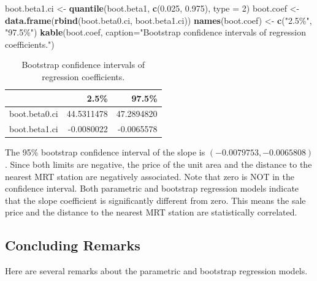 \documentclass[
]{book}
\newenvironment{Shaded}{\begin{snugshade}}{\end{snugshade}}
\newcommand{\AttributeTok}[1]{\textcolor[rgb]{0.13,0.29,0.53}{#1}}
\newcommand{\DecValTok}[1]{\textcolor[rgb]{0.00,0.00,0.81}{#1}}
\newcommand{\FloatTok}[1]{\textcolor[rgb]{0.00,0.00,0.81}{#1}}
\newcommand{\FunctionTok}[1]{\textcolor[rgb]{0.13,0.29,0.53}{\textbf{#1}}}
\newcommand{\NormalTok}[1]{#1}
\newcommand{\OtherTok}[1]{\textcolor[rgb]{0.56,0.35,0.01}{#1}}
\newcommand{\StringTok}[1]{\textcolor[rgb]{0.31,0.60,0.02}{#1}}
\begin{document}
\begin{Shaded}
\begin{Highlighting}[]
\NormalTok{boot.beta1.ci }\OtherTok{\textless{}{-}} \FunctionTok{quantile}\NormalTok{(boot.beta1, }\FunctionTok{c}\NormalTok{(}\FloatTok{0.025}\NormalTok{, }\FloatTok{0.975}\NormalTok{), }\AttributeTok{type =} \DecValTok{2}\NormalTok{)}
\NormalTok{boot.coef }\OtherTok{\textless{}{-}} \FunctionTok{data.frame}\NormalTok{(}\FunctionTok{rbind}\NormalTok{(boot.beta0.ci, boot.beta1.ci)) }
\FunctionTok{names}\NormalTok{(boot.coef) }\OtherTok{\textless{}{-}} \FunctionTok{c}\NormalTok{(}\StringTok{"2.5\%"}\NormalTok{, }\StringTok{"97.5\%"}\NormalTok{)}
\FunctionTok{kable}\NormalTok{(boot.coef, }\AttributeTok{caption=}\StringTok{"Bootstrap confidence intervals of regression coefficients."}\NormalTok{)}
\end{Highlighting}
\end{Shaded}

\begin{table}

\caption{\label{tab:unnamed-chunk-72}Bootstrap confidence intervals of regression coefficients.}
\centering
\begin{tabular}[t]{l|r|r}
\hline
  & 2.5\% & 97.5\%\\
\hline
boot.beta0.ci & 44.5311478 & 47.2894820\\
\hline
boot.beta1.ci & -0.0080022 & -0.0065578\\
\hline
\end{tabular}
\end{table}

The 95\% bootstrap confidence interval of the slope is \((-0.0079753,-0.0065808)\). Since both limits are negative, the price of the unit area and the distance to the nearest MRT station are negatively associated. Note that zero is NOT in the confidence interval. Both parametric and bootstrap regression models indicate that the slope coefficient is significantly different from zero. This means the sale price and the distance to the nearest MRT station are statistically correlated.

\hypertarget{concluding-remarks}{%
\subsection{Concluding Remarks}\label{concluding-remarks}}

Here are several remarks about the parametric and bootstrap regression models.
\end{document}
